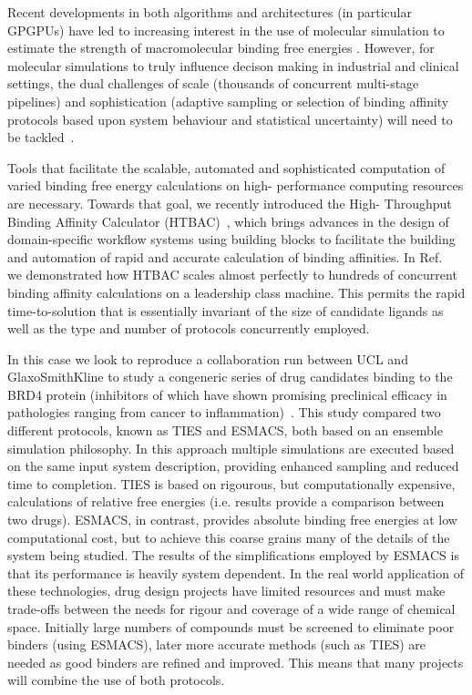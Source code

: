 Recent developments in both algorithms and architectures (in particular
GPGPUs) have led to increasing interest in the use of molecular simulation to
estimate the strength of macromolecular binding free energies
\cite{DeVivo2016}. However, for molecular simulations to truly influence
decison making in industrial and clinical settings, the dual challenges of
scale (thousands of concurrent multi-stage pipelines) and sophistication
(adaptive sampling or selection of binding affinity protocols based upon
system behaviour and statistical uncertainty) will need to be
tackled~\cite{XX}.


Tools that facilitate the scalable, automated and sophisticated computation of
varied binding free energy calculations on high- performance computing
resources are necessary. Towards that goal, we recently introduced the High-
Throughput Binding Affinity Calculator (HTBAC)~\cite{XX}, which brings
advances in the design of domain-specific workflow systems using building
blocks to facilitate the building and automation of rapid and accurate
calculation of binding affinities. In Ref.~\cite{XX} we demonstrated how HTBAC
scales almost perfectly to hundreds of concurrent binding affinity calculations on a leadership class machine. This permits the rapid 
time-to-solution that is essentially invariant of the size of candidate 
ligands as well as the type and number of protocols concurrently employed.

In this case we look to reproduce a collaboration run between UCL and
GlaxoSmithKline to study a congeneric series of drug candidates binding to the
BRD4 protein (inhibitors of which have shown promising preclinical efficacy in
pathologies ranging from cancer to inflammation)~\cite{Wan2017brd4}. This
study compared two different protocols, known as TIES and ESMACS, both based
on an ensemble simulation philosophy. In this approach multiple simulations
are executed based on the same input system description, providing enhanced
sampling and reduced time to completion. TIES is based on rigourous, but
computationally expensive, calculations of relative free energies (i.e.
results provide a comparison between two drugs). ESMACS, in contrast, provides
absolute binding free energies at low computational cost, but to achieve this
coarse grains many of the details of the system being studied. The results of
the simplifications employed by ESMACS is that its performance is heavily
system dependent. In the real world application of these technologies, drug
design projects have limited resources and must make trade-offs between the
needs for rigour and coverage of a wide range of chemical space. Initially
large numbers of compounds must be screened to eliminate poor binders (using
ESMACS), later more accurate methods (such as TIES) are needed as good binders
are refined and improved. This means that many projects will combine the use
of both protocols.

